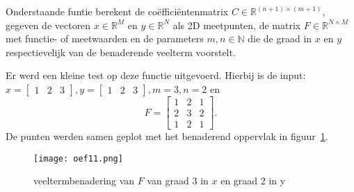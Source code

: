 Onderstaande funtie berekent de co\"effici\"entenmatrix $C \in \mathbb{R}^{(n+1) \times (m+1)}$, gegeven de vectoren $x \in \mathbb{R}^{M}$ en $y \in \mathbb{R}^{N}$ als 2D meetpunten, de matrix $F \in \mathbb{R}^{N \times M}$ met functie- of meetwaarden en de parameters $m,n \in \mathbb{N}$ die de graad in $x$ en $y$ respectievelijk van de benaderende veelterm voorstelt.


Er werd een kleine test op deze functie uitgevoerd. Hierbij is de input: $x = \begin{bmatrix}1&2&3\end{bmatrix}, y = \begin{bmatrix}1&2&3\end{bmatrix}, m = 3, n = 2$ en
$$F = \begin{bmatrix}1&2&1\\
2&3&2\\
1&2&1\end{bmatrix}.$$
De punten werden samen geplot met het benaderend oppervlak in figuur~\ref{fig:oef11}.

\begin{figure}[H]
    \centering
    \texttt{[image: oef11.png]}
    \caption{veeltermbenadering van $F$ van graad $3$ in $x$ en graad $2$ in y}
    \label{fig:oef11}
\end{figure}